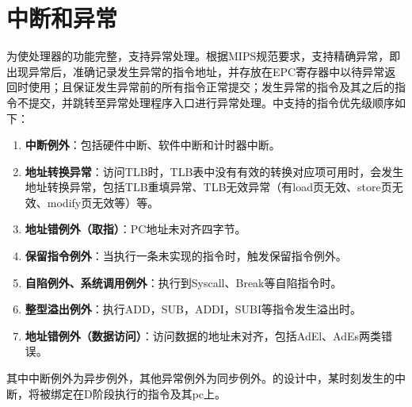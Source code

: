 \section{中断和异常}
为使处理器的功能完整，\cpuname 支持异常处理。根据MIPS规范要求，\cpuname 支持精确异常，即出现异常后，准确记录发生异常的指令地址，并存放在EPC寄存器中以待异常返回时使用；且保证发生异常前的所有指令正常提交；发生异常的指令及其之后的指令不提交，并跳转至异常处理程序入口进行异常处理。\cpuname 中支持的指令优先级顺序如下：

\begin{enumerate}
    \item \textbf{中断例外}：包括硬件中断、软件中断和计时器中断。
    \item \textbf{地址转换异常}：访问TLB时，TLB表中没有有效的转换对应项可用时，会发生地址转换异常，包括TLB重填异常、TLB无效异常（有load页无效、store页无效、modify页无效等）等。
    \item \textbf{地址错例外（取指）}：PC地址未对齐四字节。
    \item \textbf{保留指令例外}：当执行一条未实现的指令时，触发保留指令例外。
    \item \textbf{自陷例外、系统调用例外}：执行到Syscall、Break等自陷指令时。
    \item \textbf{整型溢出例外}：执行ADD，SUB，ADDI，SUBI等指令发生溢出时。
    \item \textbf{地址错例外（数据访问）}：访问数据的地址未对齐，包括AdEl、AdEs两类错误。
\end{enumerate}

其中中断例外为异步例外，其他异常例外为同步例外。\cpuname 的设计中，某时刻发生的中断，将被绑定在D阶段执行的指令及其pc上。